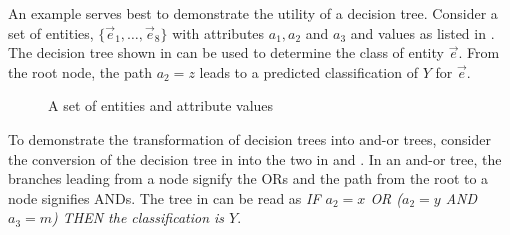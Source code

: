 An example serves best to demonstrate the utility of a decision tree. Consider a set of entities, $\{\vec e_1,\ldots, \vec e_8\}$ with attributes $a_1,a_2$ and $a_3$ and values as listed in .  The decision tree shown in  can be used to determine the class of entity $\vec e$.  From the root node, the path $a_2 = z$ leads to a predicted classification of $Y$ for $\vec e$.  

\begin{figure} [!ht]
\centering
{}
\caption{A set of entities and attribute values}
\end{figure}

To demonstrate the transformation of decision trees into and-or trees, consider the conversion of the decision tree in  into the two  in  and .  In an and-or tree, the branches leading from a node signify the ORs and the path from the root  to a node signifies ANDs.  The tree in  can be read as {\it IF $a_2 = x$ OR ($a_2 = y$ AND $a_3 = m$) THEN the classification is $Y$}.

